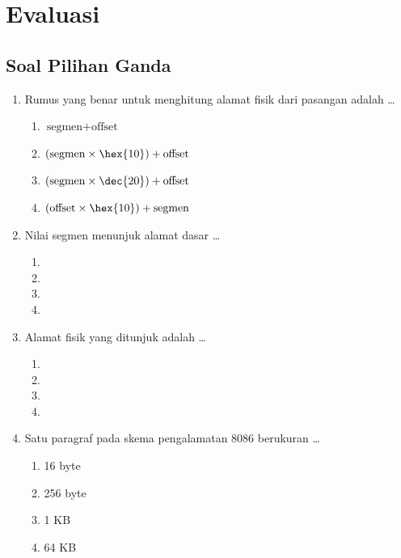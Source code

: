 \section{Evaluasi}
\label{sec:evaluasi-bab6}

\subsection{Soal Pilihan Ganda}

\begin{enumerate}
    \item Rumus yang benar untuk menghitung alamat fisik dari
          pasangan  adalah \dots
          \begin{enumerate}
              \item $\text{segmen} + \text{offset}$
              \item $(\text{segmen} \times \hex{10}) +
                    \text{offset}$
              \item $(\text{segmen} \times \dec{20}) +
                    \text{offset}$
              \item $(\text{offset} \times \hex{10}) +
                    \text{segmen}$
          \end{enumerate}

    \item Nilai segmen  menunjuk alamat dasar \dots
          \begin{enumerate}
              \item {} \item {}
              \item {} \item {}
          \end{enumerate}

    \item Alamat fisik yang ditunjuk  adalah
          \dots
          \begin{enumerate}
              \item {} \item {}
              \item {} \item {}
          \end{enumerate}

    \item Satu paragraf pada skema pengalamatan 8086 berukuran
          \dots
          \begin{enumerate}
              \item 16 byte \item 256 byte
              \item 1 KB \item 64 KB
          \end{enumerate}


\end{enumerate}
